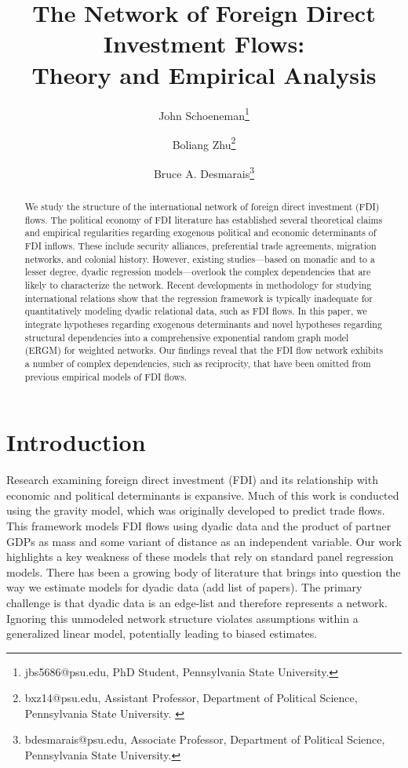\documentclass{article}
\begin{document}
\title{The Network of Foreign Direct Investment Flows: \\Theory and Empirical Analysis}
\author{John  Schoeneman\thanks{\footnotesize{
jbs5686@psu.edu, PhD Student, Pennsylvania State University.}} \and Boliang Zhu\thanks{\footnotesize{bxz14@psu.edu, Assistant Professor, Department of Political Science, Pennsylvania State University. }} \and Bruce A. Desmarais\thanks{\footnotesize{
bdesmarais@psu.edu, Associate Professor, Department of Political Science, Pennsylvania State University.}}}
\date{}
\maketitle

\singlespacing
\begin{abstract} 
    \noindent We study the structure of the international network of foreign direct investment (FDI) flows. The political economy of FDI literature has established several theoretical claims and empirical regularities regarding exogenous political and economic determinants of FDI inflows. These include security alliances, preferential trade agreements, migration networks, and colonial history. However, existing studies---based on monadic and to a lesser degree, dyadic regression models---overlook the complex dependencies that are likely to characterize the network. Recent developments in methodology for studying international relations show that the regression framework is typically inadequate for quantitatively modeling dyadic relational data, such as FDI flows. In this paper, we integrate hypotheses regarding exogenous determinants and novel hypotheses regarding structural dependencies into a comprehensive exponential random graph model (ERGM) for weighted networks. Our findings reveal that the FDI flow network  exhibits a number of complex dependencies, such as reciprocity, that have been omitted from previous empirical models of FDI flows.

\end{abstract}

\section{Introduction}

Research examining foreign direct investment (FDI) and its relationship with economic and political determinants is expansive. Much of this work is conducted using the gravity model, which was originally developed to predict trade flows. This framework models FDI flows using dyadic data and the product of partner GDPs as mass and some variant of distance as an independent variable. Our work highlights a key weakness of these models that rely on standard panel regression models. There has been a growing body of literature that brings into question the way we estimate models for dyadic data (add list of papers). The primary challenge is that dyadic data is an edge-list and therefore represents a network. Ignoring this unmodeled network structure violates assumptions within a generalized linear model, potentially leading to biased estimates.
\end{document}
